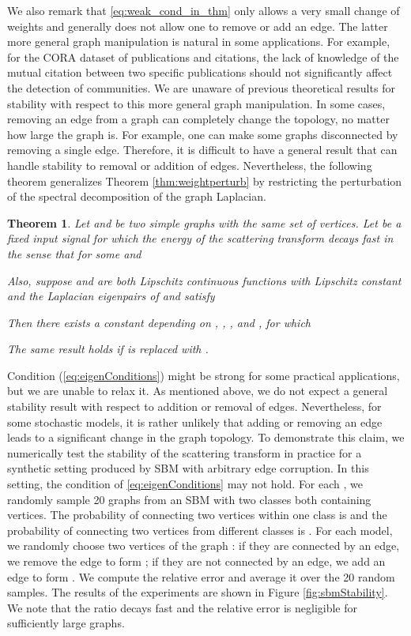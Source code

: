 \documentclass{article}
\newtheorem{theorem}{Theorem}[section]
\begin{document}
{We also remark that \eqref{eq:weak_cond_in_thm} only allows a very small change of weights and generally does not allow one to remove or add an edge.} {The latter more general graph manipulation is natural in some applications. For example, for the CORA dataset \cite{SenNB08} of publications and citations, the lack of knowledge of the mutual citation between two specific publications should not significantly affect the detection of communities. We are unaware of previous theoretical results for stability with respect to this more general graph manipulation.}
{In some cases, removing an edge from a graph can completely change the topology, no matter how large the graph is. For example, one can make some graphs disconnected by removing a single edge. Therefore, it is difficult to have a general result that can handle stability to removal or addition of edges. Nevertheless, the following theorem generalizes Theorem \ref{thm:weightperturb} by restricting the perturbation of the spectral decomposition of the graph Laplacian.} 


\begin{theorem}\label{thm:forgeneral}
Let  and  be two simple graphs with the same set of  vertices. Let  be a fixed input signal for which the energy of the scattering transform decays fast in the sense that for some  and  

Also, suppose  and  are both Lipschitz continuous functions with Lipschitz constant  and the Laplacian eigenpairs of  and  satisfy 

Then there exists a constant  depending on , , ,  and , for which

The same result holds if  is replaced with .
\end{theorem}

Condition (\ref{eq:eigenConditions}) might be strong for some practical applications, but we are unable to relax it. {As mentioned above, we do not expect a general stability result with respect to addition or removal of edges. Nevertheless, for some stochastic models, it is rather unlikely that adding or removing an edge leads to a significant change in the graph topology. To demonstrate this claim, we numerically test} the stability of the scattering transform in practice for a synthetic setting produced by SBM with arbitrary edge corruption. In this setting, the condition of \eqref{eq:eigenConditions} may not hold. For each , we randomly sample 20 graphs from an SBM with two classes both containing  vertices. The probability of connecting two vertices within one class is  and the probability of connecting two vertices from different classes is . 
For each model, 
we randomly choose two vertices of the graph : if they are connected by an edge, we remove the edge to form ; if they are not connected by an edge, we add an edge to form . 
We compute the relative error   and average it over the 20 random samples. The results of the experiments are shown in Figure \ref{fig:sbmStability}. We note that the ratio decays fast and the relative error is negligible for sufficiently large graphs.
\end{document}
